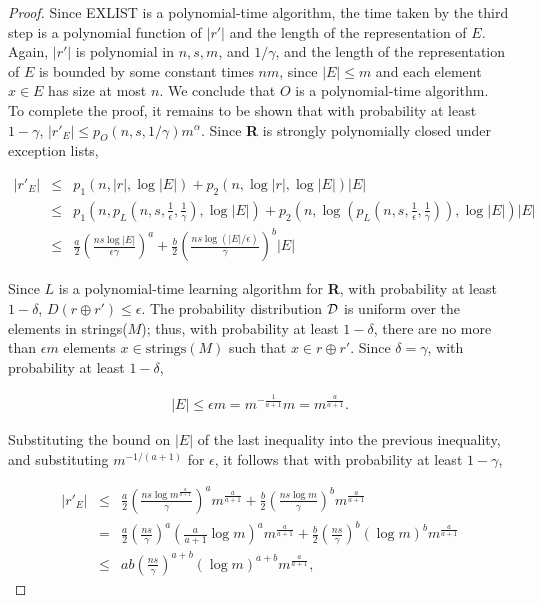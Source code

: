 \documentclass[12pt]{article}
\newcommand{\cald}{{\cal D}}
\begin{document}
\begin{proof}
Since EXLIST is a polynomial-time algorithm, the time taken by the third step is a polynomial function of $|r'|$  and the length of the representation of $E$. Again, $|r'|$ is polynomial in $n, s, m$, and $1 / \gamma$, and the length of the representation of $E$ is bounded by some constant times $nm$, since $|E| \le m$ and each element $x \in E$ has size at most $n$. We conclude that $O$ is a polynomial-time algorithm. \\

To complete the proof, it remains to be shown that with probability at least $1 - \gamma$, $|r'_E| \le p_O(n, s, 1 / \gamma)m^{\alpha}$. Since {\bf R} is strongly polynomially closed under exception lists,

\begin{eqnarray*}
|r'_E|
&\le& p_1(n, |r|, \log |E|) + p_2(n, \log |r|, \log |E|)|E| \\
&\le& p_1(n, p_L(n, s, \frac {1}{\epsilon}, \frac {1}{\gamma}), \log |E|) + p_2(n, \log (p_L(n, s, \frac {1}{\epsilon}, \frac {1}{\gamma})), \log |E|)|E| \\
&\le& \frac {a}{2} (\frac{ns \log |E|}{\epsilon \gamma})^a + \frac {b}{2} (\frac{ns \log (|E| / \epsilon)}{\gamma})^b|E|
\end{eqnarray*}

Since $L$ is a polynomial-time learning algorithm for {\bf R}, with probability at least $1 - \delta$, $D(r \oplus r') \le \epsilon$. The probability distribution $\cald$ is uniform over the elements in strings($M$); thus, with probability at least $1 - \delta$, there are no more than $\epsilon m$ elements $x \in \text {strings}(M)$ such that $x \in r \oplus r'$. Since $\delta = \gamma$, with probability at least $1 - \delta$,

\begin{eqnarray*}
|E| \le \epsilon m = m^{- \frac{1}{a+1}}m = m^{\frac {a}{a+1}}.
\end{eqnarray*}

Substituting the bound on $|E|$ of the last inequality into the previous inequality, and substituting $m^{-1/(a+1)}$ for $\epsilon$, it follows that with probability at least $1 - \gamma$,

\begin{eqnarray*}
|r'_E| 
&\le& \frac {a}{2} (\frac{ns \log m^{\frac {a}{a+1}}}{\gamma})^am^{\frac {a}{a+1}} + \frac {b}{2} (\frac{ns \log m}{\gamma})^bm^{\frac {a}{a+1}} \\
&=& \frac {a}{2} (\frac{ns}{\gamma})^a (\frac {a}{a+1} \log m)^a m^{\frac {a}{a+1}} + \frac {b}{2} (\frac{ns}{\gamma})^b (\log m)^b m^{\frac {a}{a+1}} \\
&\le& ab (\frac{ns}{\gamma})^{a+b} (\log m)^{a+b} m^{\frac {a}{a+1}},
\end{eqnarray*}


\end{proof}
\end{document}
